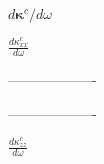 \documentclass[twocolumn,amsmath,amssymb,a4paper,prb,superscriptaddress,floatfix]{revtex4-1}
\begin{document}
{\normalsize $d\boldsymbol{\kappa}^c/d\omega$}



{\large $\frac{d\kappa^c_{xx}}{d\omega}$}

{\Huge -------------------}



{\Huge -------------------}


{\large $\frac{d\kappa^c_{zz}}{d\omega}$}
\end{document}
